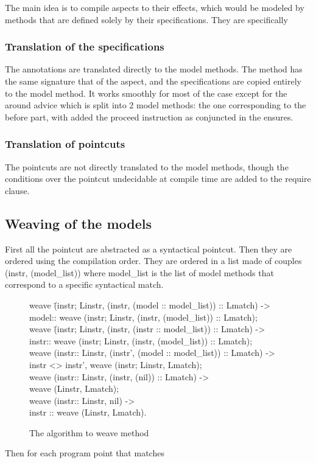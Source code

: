 The main idea is to compile aspects to their effects, which would be modeled by methods that are defined
solely by their specifications. 
They are specifically
\subsubsection{Translation of the specifications}
The annotations are translated directly to the model methods. The method has the same signature
that of the aspect, and the specifications are copied entirely to the model method. It works smoothly
for most of the case except for the around advice which is split into 2 model methods: the one corresponding
to the before part, with added the proceed instruction as conjuncted in the ensures.
\subsubsection{Translation of pointcuts}
The pointcuts are not directly translated to the model methods, though the conditions over the pointcut undecidable
at compile time are added to the require clause.
\subsection{Weaving of the models}
First all the pointcut are abstracted as a syntactical pointcut. Then they are ordered using the compilation
order.
They are ordered in a list made of couples (instr, (model\_list)) where model\_list is the list of model methods 
that correspond to a specific syntactical match.

%
\begin{figure}
\bcode
weave \=(instr; Linstr, (instr, (model :: model\_list)) :: Lmatch) -> \\
\>model:: weave (instr; Linstr, (instr, (model\_list)) :: Lmatch);\\
weave \=(instr; Linstr, (instr, (instr :: model\_list)) :: Lmatch) -> \\
\>instr:: weave (instr; Linstr, (instr, (model\_list)) :: Lmatch);\\
weave (instr:: Linstr, (instr', (model :: model\_list)) :: Lmatch) -> \\
\>instr <> instr',  weave (instr; Linstr, Lmatch);\\
weave (instr:: Linstr, (instr, (nil)) :: Lmatch) -> \\
\>weave (Linstr, Lmatch);\\
weave (instr:: Linstr, nil) -> \\
\>instr :: weave (Linstr, Lmatch).
\ecode
\caption{The algorithm to weave method}
\label{weaving_algo}
\end{figure}
Then for each program point that matches